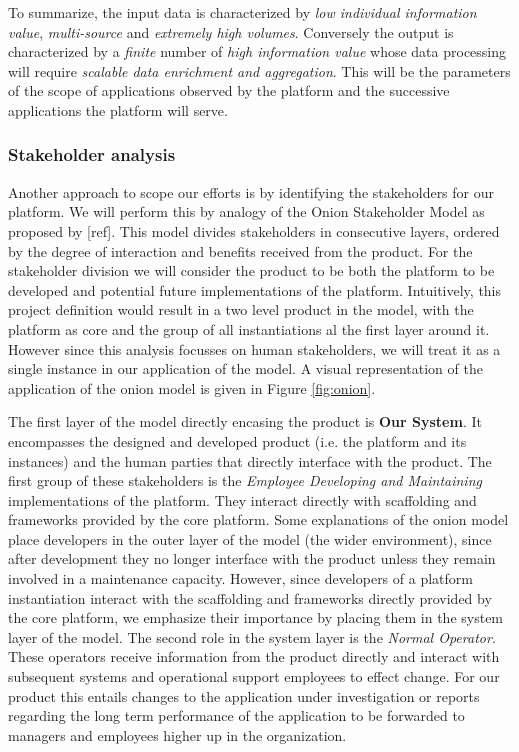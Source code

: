 To summarize, the input data is characterized by \emph{low individual information value}, \emph{multi-source} and \emph{extremely high volumes}. Conversely the output is characterized by a \emph{finite} number of \emph{high information value} whose data processing will require \emph{scalable data enrichment and aggregation}. This will be the parameters of the scope of applications observed by the platform and the successive applications the platform will serve.

\subsubsection*{Stakeholder analysis}
Another approach to scope our efforts is by identifying the stakeholders for our platform. We will perform this by analogy of the Onion Stakeholder Model as proposed by [ref]\cite{onion}. This model divides stakeholders in consecutive layers, ordered by the degree of interaction and benefits received from the product. For the stakeholder division we will consider the product to be both the platform to be developed and potential future implementations of the platform. Intuitively, this project definition would result in a two level product in the model, with the platform as core and the group of all instantiations al the first layer around it. However since this analysis focusses on human stakeholders, we will treat it as a single instance in our application of the model. A visual representation of the application of the onion model is given in Figure \ref{fig:onion}.

The first layer of the model directly encasing the product is \textbf{Our System}. It encompasses the designed and developed product (i.e. the platform and its instances) and the human parties that directly interface with the product. The first group of these stakeholders is the \emph{Employee Developing and Maintaining} implementations of the platform. They interact directly with scaffolding and frameworks provided by the core platform. Some explanations of the onion model place developers in the outer layer of the model (the wider environment), since after development they no longer interface with the product unless they remain involved in a maintenance capacity. However, since developers of a platform instantiation interact with the scaffolding and frameworks directly provided by the core platform, we emphasize their importance by placing them in the system layer of the model. The second role in the system layer is the \emph{Normal Operator}. These operators receive information from the product directly and interact with subsequent systems and operational support employees to effect change. For our product this entails changes to the application under investigation or reports regarding the long term performance of the application to be forwarded to managers and employees higher up in the organization.

